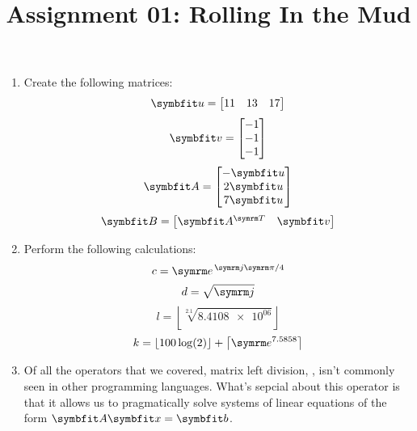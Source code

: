 \documentclass{article}
\title{Assignment 01: Rolling In the Mud}
\begin{document}
\renderTitle

\begin{enumerate}[leftmargin=*]
	\item
		Create the following matrices:
		\begin{equation}
			\mat{u} =
			\begin{bmatrix}
				11 & 13 & 17
			\end{bmatrix}
		\end{equation}
		\begin{equation}
			\mat{v} =
			\begin{bmatrix}
				-1 \\
				-1 \\
				-1 \\
			\end{bmatrix}
		\end{equation}
		\begin{equation}
			\mat{A} =
			\begin{bmatrix}
				-\mat{u} \\
				2\mat{u} \\
				7\mat{u} \\
			\end{bmatrix}
		\end{equation}
		\begin{equation}
			\mat{B} =
			\begin{bmatrix}
				\mat{A}^\T & \mat{v}
			\end{bmatrix}
		\end{equation}

	\item
		Perform the following calculations:
		\begin{equation}
			c = \e^{\,\im\cpi / 4}
		\end{equation}
		\begin{equation}
			d = \sqrt{\im}
		\end{equation}
		\begin{equation}
			l
			=
			\left\lfloor
			\sqrt[2.1]{\num{8.4108e+06}}
			\right\rfloor
		\end{equation}
		\begin{equation}
			k
			=
			\lfloor100\log(2)\rfloor
			+
			\left\lceil\e^{7.5858}\right\rceil
		\end{equation}

	\item
		Of all the operators that we covered, matrix left
		division, , isn't commonly seen
		in other programming languages.  What's sepcial about
		this operator is that it allows us to pragmatically
		solve systems of linear equations of the form
		\(\mat{A}\mat{x} = \mat{b}\).


\end{enumerate}
\end{document}
